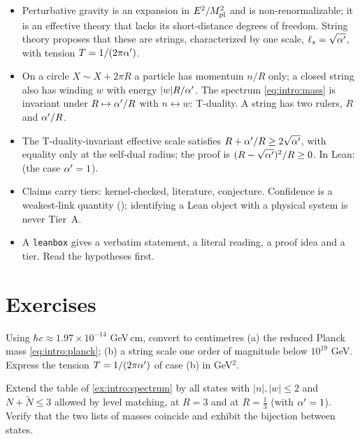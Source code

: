 \begin{summarybox}
\begin{itemize}[leftmargin=*,itemsep=1pt]
\item Perturbative gravity is an expansion in $E^2/M_{\rm pl}^2$ and is non-renormalizable; it
is an effective theory that lacks its short-distance degrees of freedom. String theory
proposes that these are strings, characterized by one scale, $\ell_s=\sqrt{\alpha'}$, with tension
$T=1/(2\pi\alpha')$.
\item On a circle $X\sim X+2\pi R$ a particle has momentum $n/R$ only; a closed string also
has winding $w$ with energy $|w|R/\alpha'$. The spectrum \eqref{eq:intro:mass} is invariant under
$R\mapsto\alpha'/R$ with $n\leftrightarrow w$: T-duality. A string has two rulers, $R$ and $\alpha'/R$.
\item The T-duality-invariant effective scale satisfies $R+\alpha'/R\ge2\sqrt{\alpha'}$, with equality
only at the self-dual radius; the proof is $(R-\sqrt{\alpha'})^2/R\ge0$. In Lean:
 (the case $\alpha'=1$).
\item Claims carry tiers: \TA{} kernel-checked, \TL{} literature, \TC{} conjecture. Confidence
is a weakest-link quantity (); identifying a Lean object with a
physical system is never Tier~A.
\item A \texttt{leanbox} gives a verbatim statement, a literal reading, a proof idea and a
tier. Read the hypotheses first.
\end{itemize}
\end{summarybox}

\section*{Exercises}

\begin{exercise}[$\star$]\label{exr:intro:units}
Using $\hbar c\approx1.97\times10^{-14}$ GeV\,cm, convert to centimetres (a) the reduced
Planck mass \eqref{eq:intro:planck}; (b) a string scale one order of magnitude below
$10^{19}$ GeV. Express the tension $T=1/(2\pi\alpha')$ of case (b) in GeV$^2$.
\end{exercise}

\begin{exercise}[$\star$]\label{exr:intro:table}
Extend the table of \cref{ex:intro:spectrum} by all states with $|n|,|w|\le2$ and
$N+\tilde N\le3$ allowed by level matching, at $R=3$ and at $R=\tfrac13$ (with $\alpha'=1$).
Verify that the two lists of masses coincide and exhibit the bijection between states.
\end{exercise}

